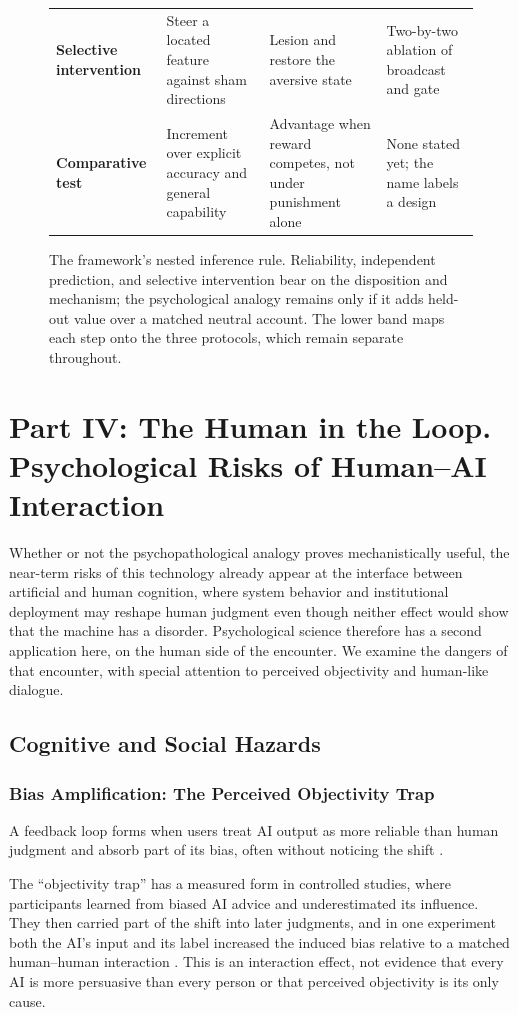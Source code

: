\documentclass{article}
\begin{document}
\begin{figure}[htbp]
{\begin{minipage}{0.91\textwidth}
\begin{tabularx}{\textwidth}{>{\raggedright\arraybackslash}p{2.1cm} >{\raggedright\arraybackslash}X >{\raggedright\arraybackslash}X >{\raggedright\arraybackslash}X}
            \addlinespace
            \textbf{Selective intervention} & Steer a located feature against sham directions & Lesion and restore the aversive state & Two-by-two ablation of broadcast and gate \\
            \addlinespace
            \textbf{Comparative test} & Increment over explicit accuracy and general capability & Advantage when reward competes, not under punishment alone & None stated yet; the name labels a design \\
            \bottomrule
        \end{tabularx}
    \end{minipage}}
    \caption{The framework's nested inference rule. Reliability, independent prediction, and selective intervention bear on the disposition and mechanism; the psychological analogy remains only if it adds held-out value over a matched neutral account. The lower band maps each step onto the three protocols, which remain separate throughout.}
    \label{fig:inference-ladder}
\end{figure}
\section{Part IV: The Human in the Loop. Psychological Risks of Human--AI Interaction}
Whether or not the psychopathological analogy proves mechanistically useful, the near-term risks of this technology already appear at the interface between artificial and human cognition, where system behavior and institutional deployment may reshape human judgment even though neither effect would show that the machine has a disorder. Psychological science therefore has a second application here, on the human side of the encounter. We examine the dangers of that encounter, with special attention to perceived objectivity and human-like dialogue.

\subsection{Cognitive and Social Hazards}
\subsubsection{Bias Amplification: The Perceived Objectivity Trap}
A feedback loop forms when users treat AI output as more reliable than human judgment and absorb part of its bias, often without noticing the shift \citep{ref30}.

The ``objectivity trap'' has a measured form in controlled studies, where participants learned from biased AI advice and underestimated its influence. They then carried part of the shift into later judgments, and in one experiment both the AI's input and its label increased the induced bias relative to a matched human--human interaction \citep{ref30}. This is an interaction effect, not evidence that every AI is more persuasive than every person or that perceived objectivity is its only cause.
\end{document}
